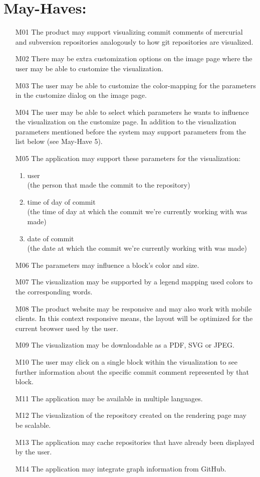 \documentclass[12pt]{scrartcl}
\begin{document}
\section{May-Haves:}
\begin{enumerate}
\item [M01] The product may support visualizing commit comments of mercurial and
	subversion repositories analogously to how git repositories are
	visualized.
\item [M02] There may be extra customization options on the image page where the user may be able to customize the visualization.
\item [M03] The user may be able to customize the color-mapping for the parameters in the customize dialog on the image page.
\item [M04] The user may be able to select which parameters he wants to influence the visualization on the customize page. In addition to the visualization parameters mentioned before the system may support parameters from the list below (see May-Have 5).
\item [M05] The application may support these parameters for the visualization:
\begin{enumerate}
\item user\\
(the person that made the commit to the repository)
\item time of day of commit\\
(the time of day at which the commit we're currently working with was made)
\item date of commit\\
(the date at which the commit we're currently working with was made)
\end{enumerate}
\item [M06] The parameters may influence a block's color and size.
\item [M07] The visualization may be supported by a legend mapping used colors to the corresponding words.
\item [M08] The product website may be responsive and may also work with mobile clients. In this context responsive means, the layout will be optimized for the current browser used by the user.
\item [M09] The visualization may be downloadable as a PDF, SVG or JPEG.
\item [M10] The user may click on a single block within the visualization to see further information about the specific commit comment represented by that block.
\item [M11] The application may be available in multiple languages.
\item [M12] The visualization of the repository created on the rendering page may be scalable.
\item [M13] The application may cache repositories that have already been displayed by the user.
\item [M14] The application may integrate graph information from GitHub.
\end{enumerate}
\end{document}
